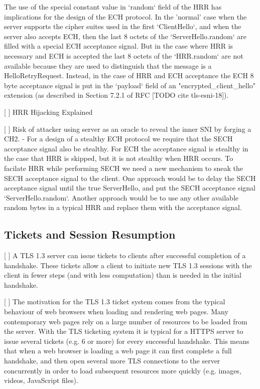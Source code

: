 The use of the special constant value in `random` field of the HRR has implications for the design of the ECH protocol. In the 'normal' case when the server supports the cipher suites used in the first `ClientHello`, and when the server also accepts ECH, then the last 8 octets of the `ServerHello.random` are filled with a special ECH acceptance signal. But in the case where HRR is necessary and ECH is accepted the last 8 octets of the `HRR.random` are not available because they are used to distinguish that the message is a HelloRetryRequest. Instead, in the case of HRR and ECH acceptance the ECH 8 byte acceptance signal is put in the `payload` field of an "encrypted_client_hello" extension (as described in Section 7.2.1 of RFC [TODO cite tls-esni-18]).

[ ] HRR Hijacking Explained

[ ] Risk of attacker using server as an oracle to reveal the inner SNI by forging a CH2.
        - For a design of a stealthy ECH protocol we require that the SECH acceptance signal also be stealthy. For ECH the acceptance signal is stealthy in the case that HRR is skipped, but it is not stealthy when HRR occurs. To facilate HRR while performing SECH we need a new mechanism to sneak the SECH acceptance signal to the client. One approach would be to delay the SECH acceptance signal until the true ServerHello, and put the SECH acceptance signal `ServerHello.random`. Another approach would be to use any other available random bytes in a typical HRR and replace them with the acceptance signal.

\subsection{Tickets and Session Resumption}

[ ] A TLS 1.3 server can issue tickets to clients after successful completion of a handshake. These tickets allow a client to initiate new TLS 1.3 sessions with the client in fewer steps (and with less computation) than is needed in the initial handshake.

[ ] The motivation for the TLS 1.3 ticket system comes from the typical behaviour of web browsers when loading and rendering web pages. Many contemporary web pages rely on a large number of resources to be loaded from the server. With the TLS ticketing system it is typical for a HTTPS server to issue several tickets (e.g. 6 or more) for every successful handshake. This means that when a web browser is loading a web page it can first complete a full handshake, and then open several more TLS connections to the server concurrently in order to load subsequent resources more quickly (e.g. images, videos, JavaScript files).

